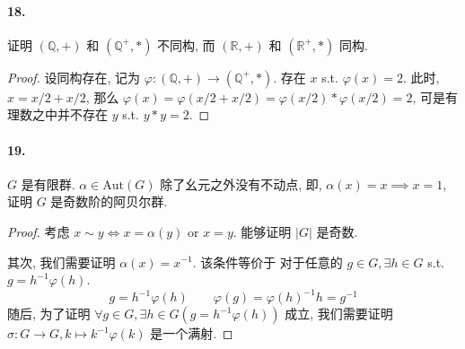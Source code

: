 \documentclass[12pt]{ctexart}
\theoremstyle{definition}
\theoremstyle{definition}
\theoremstyle{plain}
\theoremstyle{remark}
\begin{document}
\paragraph{18.} 证明 \((\mathbb{Q} , + )\) 和 \((\mathbb{Q}^{+}, * )\) 不同构, 而 \((\mathbb{R}, + ) \) 和 \((\mathbb{R} ^{+} , * )\) 同构. 
\begin{proof}
设同构存在, 记为 \(\varphi: (\mathbb{Q} , + ) \to (\mathbb{Q} ^{+}, *)\). 
存在 \(x\) s.t. \( \varphi (x) = 2\). 此时, \(x = x / 2 + x / 2\), 那么 \( \varphi (x) = \varphi (x / 2 + x /2) = \varphi (x/ 2) * \varphi(x /2 ) = 2\), 可是有理数之中并不存在 \(y \) s.t. \(y * y = 2\). 
\end{proof}

\paragraph{19.} \(G\) 是有限群. \(\alpha \in \text{Aut} (G)\) 除了幺元之外没有不动点, 即, \(\alpha (x) = x \implies x = 1\), 证明 \(G\) 是奇数阶的阿贝尔群.  
\begin{proof}
	考虑 \(x \sim y \iff x =\alpha (y) \text{ or } x = y\). 能够证明 \(|G|\) 是奇数. 

其次, 我们需要证明 \(\alpha (x) = x ^{-1}\). 该条件等价于 对于任意的 \(g \in G, \exists h \in G\) s.t. \(g = h ^{-1} \varphi (h)\).
\[
g = h ^{-1} \varphi (h ) \qquad \varphi (g) = \varphi (h ) ^{-1} h  = g ^{-1}
\]
随后, 为了证明 \(\forall g \in G ,\exists h \in G  (g = h^{-1} \varphi (h))\) 成立, 我们需要证明 \(\sigma \colon G \to G , k \mapsto k ^{-1} \varphi (k )\) 是一个满射. 
\end{proof}

\end{document}
